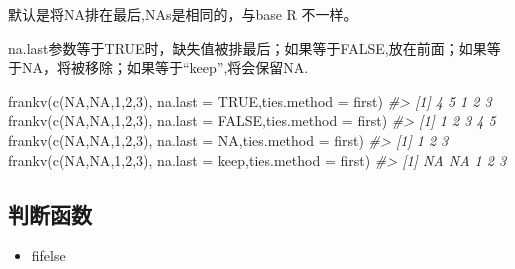 \documentclass[
]{book}
\newenvironment{Shaded}{\begin{snugshade}}{\end{snugshade}}
\newcommand{\AttributeTok}[1]{\textcolor[rgb]{0.77,0.63,0.00}{#1}}
\newcommand{\CommentTok}[1]{\textcolor[rgb]{0.56,0.35,0.01}{\textit{#1}}}
\newcommand{\ConstantTok}[1]{\textcolor[rgb]{0.00,0.00,0.00}{#1}}
\newcommand{\DecValTok}[1]{\textcolor[rgb]{0.00,0.00,0.81}{#1}}
\newcommand{\FunctionTok}[1]{\textcolor[rgb]{0.00,0.00,0.00}{#1}}
\newcommand{\NormalTok}[1]{#1}
\newcommand{\StringTok}[1]{\textcolor[rgb]{0.31,0.60,0.02}{#1}}
\providecommand{\tightlist}{%
  \setlength{\itemsep}{0pt}\setlength{\parskip}{0pt}}
\begin{document}
默认是将NA排在最后,NAs是相同的，与base R 不一样。

na.last参数等于TRUE时，缺失值被排最后；如果等于FALSE,放在前面；如果等于NA，将被移除；如果等于``keep'',将会保留NA.

\begin{Shaded}
\begin{Highlighting}[]
\FunctionTok{frankv}\NormalTok{(}\FunctionTok{c}\NormalTok{(}\ConstantTok{NA}\NormalTok{,}\ConstantTok{NA}\NormalTok{,}\DecValTok{1}\NormalTok{,}\DecValTok{2}\NormalTok{,}\DecValTok{3}\NormalTok{), }\AttributeTok{na.last =} \ConstantTok{TRUE}\NormalTok{,}\AttributeTok{ties.method =} \StringTok{\textquotesingle{}first\textquotesingle{}}\NormalTok{)}
\CommentTok{\#\textgreater{} [1] 4 5 1 2 3}
\FunctionTok{frankv}\NormalTok{(}\FunctionTok{c}\NormalTok{(}\ConstantTok{NA}\NormalTok{,}\ConstantTok{NA}\NormalTok{,}\DecValTok{1}\NormalTok{,}\DecValTok{2}\NormalTok{,}\DecValTok{3}\NormalTok{), }\AttributeTok{na.last =} \ConstantTok{FALSE}\NormalTok{,}\AttributeTok{ties.method =} \StringTok{\textquotesingle{}first\textquotesingle{}}\NormalTok{)}
\CommentTok{\#\textgreater{} [1] 1 2 3 4 5}
\FunctionTok{frankv}\NormalTok{(}\FunctionTok{c}\NormalTok{(}\ConstantTok{NA}\NormalTok{,}\ConstantTok{NA}\NormalTok{,}\DecValTok{1}\NormalTok{,}\DecValTok{2}\NormalTok{,}\DecValTok{3}\NormalTok{), }\AttributeTok{na.last =} \ConstantTok{NA}\NormalTok{,}\AttributeTok{ties.method =} \StringTok{\textquotesingle{}first\textquotesingle{}}\NormalTok{)}
\CommentTok{\#\textgreater{} [1] 1 2 3}
\FunctionTok{frankv}\NormalTok{(}\FunctionTok{c}\NormalTok{(}\ConstantTok{NA}\NormalTok{,}\ConstantTok{NA}\NormalTok{,}\DecValTok{1}\NormalTok{,}\DecValTok{2}\NormalTok{,}\DecValTok{3}\NormalTok{), }\AttributeTok{na.last =} \StringTok{\textquotesingle{}keep\textquotesingle{}}\NormalTok{,}\AttributeTok{ties.method =} \StringTok{\textquotesingle{}first\textquotesingle{}}\NormalTok{)}
\CommentTok{\#\textgreater{} [1] NA NA  1  2  3}
\end{Highlighting}
\end{Shaded}

\hypertarget{ux5224ux65adux51fdux6570}{%
\subsection{判断函数}\label{ux5224ux65adux51fdux6570}}

\begin{itemize}
\tightlist
\item
  fifelse
\end{itemize}
\end{document}
